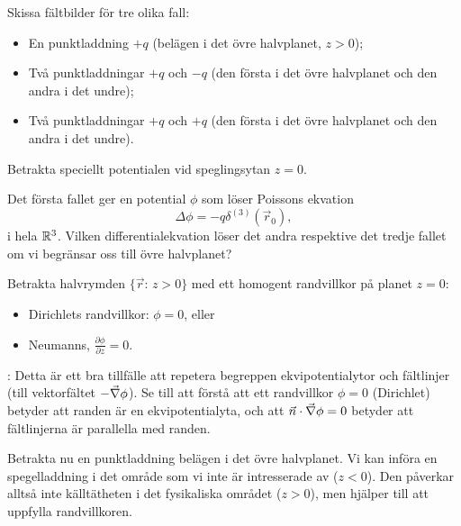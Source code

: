 \documentclass[%
oneside,                 %
final,                   %
10pt]{article}
\newcommand{\longinlinecomment}[3]{{\color{red}{\bf #1}: #2}}
\newenvironment{summary_mdfboxadmon}[1][]{
\begin{summary_mdfboxmdframed}[frametitle=#1]
}
{
\end{summary_mdfboxmdframed}
}
\begin{document}
\noindent

\begin{summary_mdfboxadmon}
Skissa fältbilder för tre olika fall:
\begin{itemize}
\item En punktladdning $+q$ (belägen i det övre halvplanet, $z>0$);

\item Två punktladdningar $+q$ och $-q$ (den första i det övre halvplanet och den andra i det undre);

\item Två punktladdningar $+q$ och $+q$ (den första i det övre halvplanet och den andra i det undre).
\end{itemize}

\noindent
Betrakta speciellt potentialen vid speglingsytan $z=0$.
\end{summary_mdfboxadmon} %




\begin{summary_mdfboxadmon}
Det första fallet ger en potential $\phi$ som löser Poissons ekvation 
$$
\Delta \phi = -q \delta^{(3)}(\vec{r}_0),
$$ 
i hela $\Bbb{R}^3$.
Vilken differentialekvation löser det andra respektive det tredje fallet om vi begränsar oss till övre halvplanet?
\end{summary_mdfboxadmon} %



Betrakta halvrymden $\{\vec{r}:\,z>0\}$ med ett homogent randvillkor på planet
$z=0$: 
\begin{itemize}
\item Dirichlets randvillkor: $\phi=0$, eller 

\item Neumanns, $\frac{\partial \phi}{\partial z} = 0$.
\end{itemize}

\noindent
\longinlinecomment{Kommentar 2}{ Detta är ett bra tillfälle att repetera begreppen ekvipotentialytor och fältlinjer (till vektorfältet $-\vec{\nabla}\phi$). Se till att förstå att ett randvillkor $\phi=0$ (Dirichlet) betyder att randen är en ekvipotentialyta, och att $\vec n \cdot \vec{\nabla}\phi=0$ betyder att fältlinjerna är parallella med randen. }{ Detta är ett bra }

Betrakta nu en punktladdning belägen i det övre halvplanet. Vi kan införa en spegelladdning i det område som vi inte är intresserade av ($z<0$). Den påverkar alltså inte källtätheten i det fysikaliska området ($z>0$), men hjälper till att uppfylla randvillkoren.
\end{document}

